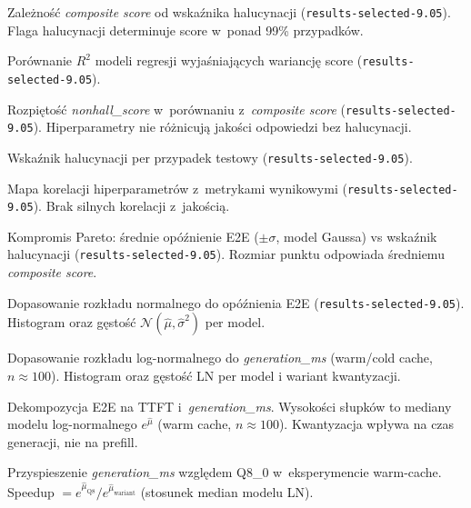 
\caption{Zależność \emph{composite score} od wskaźnika halucynacji
         (\texttt{results-selected-9.05}). Flaga halucynacji determinuje
         score w~ponad 99\% przypadków.}

\caption{Porównanie $R^2$ modeli regresji wyjaśniających wariancję score
         (\texttt{results-selected-9.05}).}

\caption{Rozpiętość \emph{nonhall\_score} w~porównaniu z~\emph{composite score}
         (\texttt{results-selected-9.05}). Hiperparametry nie różnicują
         jakości odpowiedzi bez halucynacji.}

\caption{Wskaźnik halucynacji per przypadek testowy
         (\texttt{results-selected-9.05}).}

\caption{Mapa korelacji hiperparametrów z~metrykami wynikowymi
         (\texttt{results-selected-9.05}). Brak silnych korelacji z~jakością.}

\caption{Kompromis Pareto: średnie opóźnienie E2E ($\pm\sigma$, model Gaussa)
         vs wskaźnik halucynacji (\texttt{results-selected-9.05}).
         Rozmiar punktu odpowiada średniemu \emph{composite score}.}

\caption{Dopasowanie rozkładu normalnego do opóźnienia E2E
         (\texttt{results-selected-9.05}). Histogram oraz gęstość
         $\mathcal{N}(\hat\mu,\hat\sigma^2)$ per model.}

\caption{Dopasowanie rozkładu log-normalnego do \emph{generation\_ms}
         (warm/cold cache, $n\approx 100$). Histogram oraz gęstość LN
         per model i wariant kwantyzacji.}

\caption{Dekompozycja E2E na TTFT i~\emph{generation\_ms}.
         Wysokości słupków to mediany modelu log-normalnego $e^{\hat\mu}$
         (warm cache, $n\approx 100$). Kwantyzacja wpływa na czas generacji,
         nie na prefill.}

\caption{Przyspieszenie \emph{generation\_ms} względem Q8\_0
         w~eksperymencie warm-cache.
         Speedup $= e^{\hat\mu_{\mathrm{Q8}}}/e^{\hat\mu_{\mathrm{wariant}}}$
         (stosunek median modelu LN).}

